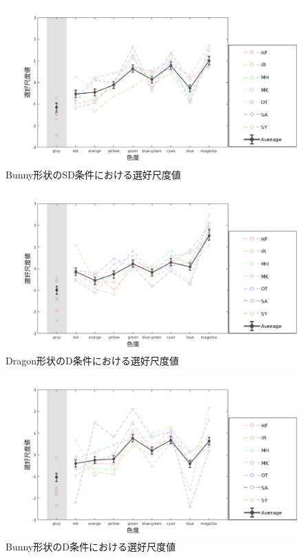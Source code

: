             \begin{figure}[h]
                \centering
                \includegraphics[width=15.0cm]{./img/ex1_res_BSD_p.png}
                \caption{Bunny形状のSD条件における選好尺度値}
                \label{ex1_BSD}
            \end{figure}
            
            \newpage
            \begin{figure}[h]
                \centering
                \includegraphics[width=15.0cm]{./img/ex1_res_DD_p.png}
                \caption{Dragon形状のD条件における選好尺度値}
                \label{ex1_DD}
            \end{figure}

            \begin{figure}[h]
                \centering
                \includegraphics[width=15.0cm]{./img/ex1_res_BD_p.png}
                \caption{Bunny形状のD条件における選好尺度値}
                \label{ex1_BD}
            \end{figure}

